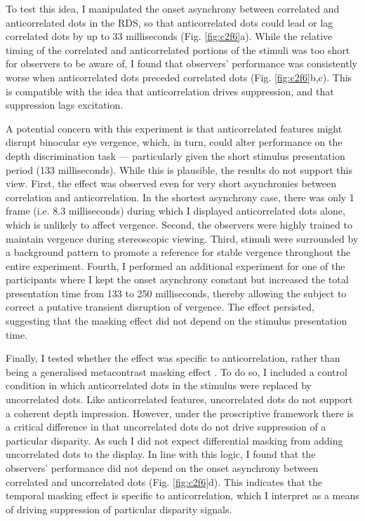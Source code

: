 To test this idea, I manipulated the onset asynchrony between correlated and anticorrelated dots in the RDS, so that anticorrelated dots could lead or lag correlated dots by up to 33 milliseconds (Fig. \ref{fig:c2f6}a). While the relative timing of the correlated and anticorrelated portions of the stimuli was too short for observers to be aware of, I found that observers' performance was consistently worse when anticorrelated dots preceded correlated dots (Fig. \ref{fig:c2f6}b,c). This is compatible with the idea that anticorrelation drives suppression, and that suppression lags excitation.

A potential concern with this experiment is that anticorrelated features might disrupt binocular eye vergence, which, in turn, could alter performance on the depth discrimination task --- particularly given the short stimulus presentation period (133 milliseconds). While this is plausible, the results do not support this view. First, the effect was observed even for very short asynchronies between correlation and anticorrelation. In the shortest asynchrony case, there was only 1 frame (i.e. 8.3 milliseconds) during which I displayed anticorrelated dots alone, which is unlikely to affect vergence. Second, the observers were highly trained to maintain vergence during stereoscopic viewing. Third, stimuli were surrounded by a background pattern to promote a reference for stable vergence throughout the entire experiment. Fourth, I performed an additional experiment for one of the participants where I kept the onset asynchrony constant but increased the total presentation time from 133 to 250 milliseconds, thereby allowing the subject to correct a putative transient disruption of vergence. The effect persisted, suggesting that the masking effect did not depend on the stimulus presentation time.

Finally, I tested whether the effect was specific to anticorrelation, rather than being a generalised metacontrast masking effect \cite{breitmeyer1984visual}. To do so, I included a control condition in which anticorrelated dots in the stimulus were replaced by uncorrelated dots. Like anticorrelated features, uncorrelated dots do not support a coherent depth impression. However, under the proscriptive framework there is a critical difference in that uncorrelated dots do not drive suppression of a particular disparity. As such I did not expect differential masking from adding uncorrelated dots to the display. In line with this logic, I found that the observers' performance did not depend on the onset asynchrony between correlated and uncorrelated dots (Fig. \ref{fig:c2f6}d). This indicates that the temporal masking effect is specific to anticorrelation, which I interpret as a means of driving suppression of particular disparity signals.

